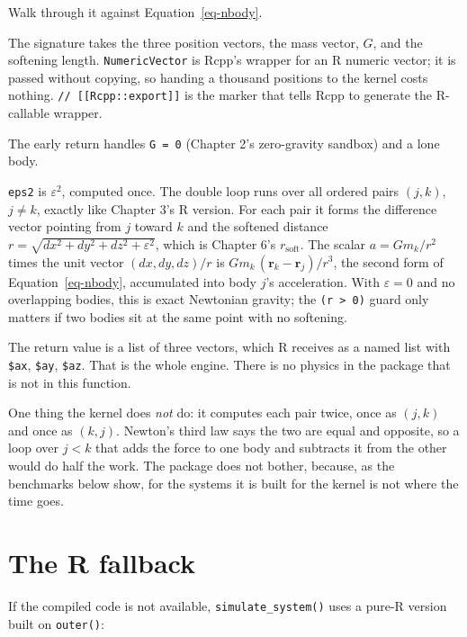 \documentclass[
  10.5pt,
  letterpaper,
]{scrbook}
\theoremstyle{plain}
\theoremstyle{remark}
\begin{document}
Walk through it against Equation~\ref{eq-nbody}.

The signature takes the three position vectors, the mass vector, \(G\),
and the softening length. \texttt{NumericVector} is Rcpp's wrapper for
an R numeric vector; it is passed without copying, so handing a thousand
positions to the kernel costs nothing.
\texttt{//\ {[}{[}Rcpp::export{]}{]}} is the marker that tells Rcpp to
generate the R-callable wrapper.

The early return handles \texttt{G\ =\ 0} (Chapter 2's zero-gravity
sandbox) and a lone body.

\texttt{eps2} is \(\varepsilon^2\), computed once. The double loop runs
over all ordered pairs \((j, k)\), \(j \ne k\), exactly like Chapter 3's
R version. For each pair it forms the difference vector pointing from
\(j\) toward \(k\) and the softened distance
\(r = \sqrt{dx^2 + dy^2 + dz^2 + \varepsilon^2}\), which is Chapter 6's
\(r_{\mathrm{soft}}\). The scalar \(a = Gm_k/r^2\) times the unit vector
\((dx, dy, dz)/r\) is \(Gm_k\,(\mathbf{r}_k - \mathbf{r}_j)/r^3\), the
second form of Equation~\ref{eq-nbody}, accumulated into body \(j\)'s
acceleration. With \(\varepsilon = 0\) and no overlapping bodies, this
is exact Newtonian gravity; the \texttt{(r\ \textgreater{}\ 0)} guard
only matters if two bodies sit at the same point with no softening.

The return value is a list of three vectors, which R receives as a named
list with \texttt{\$ax}, \texttt{\$ay}, \texttt{\$az}. That is the whole
engine. There is no physics in the package that is not in this function.

One thing the kernel does \emph{not} do: it computes each pair twice,
once as \((j,k)\) and once as \((k,j)\). Newton's third law says the two
are equal and opposite, so a loop over \(j < k\) that adds the force to
one body and subtracts it from the other would do half the work. The
package does not bother, because, as the benchmarks below show, for the
systems it is built for the kernel is not where the time goes.

\section{The R fallback}\label{the-r-fallback}

If the compiled code is not available, \texttt{simulate\_system()} uses
a pure-R version built on \texttt{outer()}:
\end{document}
